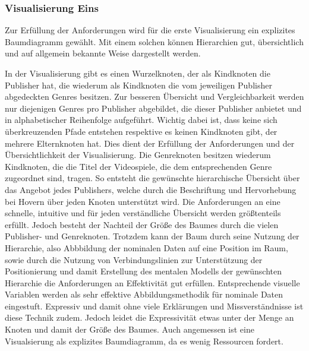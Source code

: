 \documentclass[usegeometry=true]{scrartcl}
\begin{document}
\subsubsection{Visualisierung Eins}
Zur Erfüllung der Anforderungen wird für die erste Visualisierung ein explizites Baumdiagramm gewählt.
Mit einem solchen können Hierarchien gut, übersichtlich und auf allgemein bekannte Weise dargestellt werden. 


In der Visualisierung gibt es einen Wurzelknoten, der als Kindknoten die Publisher hat, die wiederum als Kindknoten die vom jeweiligen Publisher abgedeckten Genres besitzen. 
Zur besseren Übersicht und Vergleichbarkeit werden nur diejenigen Genres pro Publisher abgebildet, die dieser Publisher anbietet und in alphabetischer Reihenfolge aufgeführt. 
Wichtig dabei ist, dass keine sich überkreuzenden Pfade entstehen respektive es keinen Kindknoten gibt, der mehrere Elternknoten hat. 
Dies dient der Erfüllung der Anforderungen und der Übersichtlichkeit der Visualisierung.
Die Genreknoten besitzen wiederum Kindknoten, die die Titel der Videospiele, die dem entsprechenden Genre zugeordnet sind, tragen. 
So entsteht die gewünschte hierarchische Übersicht über das Angebot jedes Publishers, welche durch die Beschriftung und Hervorhebung bei Hovern über jeden Knoten unterstützt wird.
Die Anforderungen an eine schnelle, intuitive und für jeden verständliche Übersicht werden größtenteils erfüllt. 
Jedoch besteht der Nachteil der Größe des Baumes durch die vielen Publisher- und Genreknoten. 
Trotzdem kann der Baum durch seine Nutzung der Hierarchie, also Abbbildung der nominalen Daten auf eine Position im Raum, sowie durch die Nutzung von Verbindungslinien zur Unterstützung der Positionierung und damit Erstellung des mentalen Modells der gewünschten Hierarchie die Anforderungen an Effektivität gut erfüllen.
Entsprechende visuelle Variablen werden als sehr effektive Abbildungsmethodik für nominale Daten eingestuft. 
Expressiv und damit ohne viele Erklärungen und Missverständnisse ist diese Technik zudem.
Jedoch leidet die Expressivität etwas unter der Menge an Knoten und damit der Größe des Baumes.
Auch angemessen ist eine Visualsierung als explizites Baumdiagramm, da es wenig Ressourcen fordert. 
\end{document}
